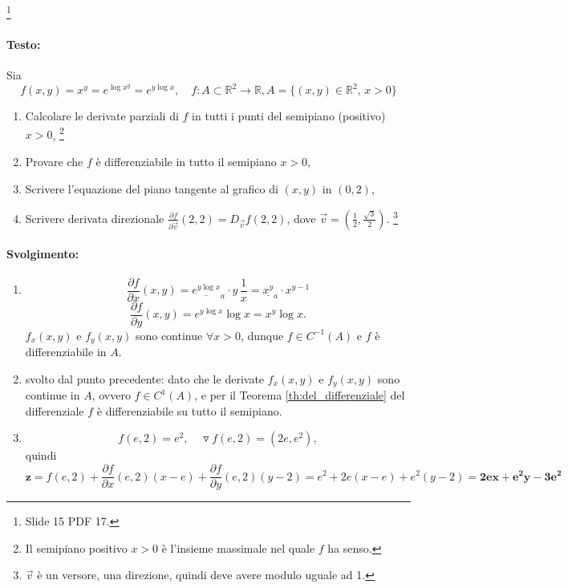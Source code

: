 \begin{example}
	\footnote{Slide 15 PDF 17.}
	\paragraph{Testo:} Sia
	\begin{equation*}
		f(x,y) = x^y = e^{\log{x^y}} = e^{y\log x},\quad f\colon A\subset\mathbb{R}^2\rightarrow\mathbb{R}, A=\{(x,y)\in\mathbb{R}^2,\, x>0\}
	\end{equation*}
	\begin{enumerate}
		\item Calcolare le derivate parziali di $f$ in tutti i punti del semipiano (positivo) $x>0$, \footnote{Il semipiano positivo $x>0$ è l'insieme massimale nel quale $f$ ha senso.}
		\item Provare che $f$ è differenziabile in tutto il semipiano $x>0$,
		\item Scrivere l'equazione del piano tangente al grafico di $(x,y)$ in $(0,2)$,
		\item Scrivere derivata direzionale $\frac{\partial f}{\partial \vec{v}}(2,2) = D_{\vec{v}} f(2,2)$, dove $\vec v = \left(\frac{1}{2}, \frac{\sqrt{3}}{2}\right)$. \footnote{$\vec v$ è un versore, una direzione, quindi deve avere modulo uguale ad 1.}
	\end{enumerate}
	\paragraph{Svolgimento:}
	\begin{enumerate}
		\item
		\begin{equation*}
			\frac{\partial f}{\partial x} (x,y) = \underline{e^{y\log x}}_{a}\cdot y\,\frac{1}{x} = \underline{x^y}_{a} \cdot x^{y-1} 
		\end{equation*}
		\begin{equation*}
			\frac{\partial f}{\partial y}(x,y) = e^{y\log x} \log x = x^y \log x.
		\end{equation*}
		$f_x(x,y)$ e $f_y(x,y)$ sono continue $\forall x>0$, dunque $f\in C^{-1}(A)$ e $f$ è differenziabile in $A$. 
		\item svolto dal punto precedente: dato che le derivate $f_x(x,y)$ e $f_y(x,y)$ sono continue in $A$, ovvero $f\in C^1(A)$, e per il Teorema \ref{th:del_differenziale} del differenziale $f$ è differenziabile su tutto il semipiano.
		\item
		\begin{equation*}
			f(e,2) = e^2,\quad \triangledown f(e,2) = (2e, e^2),
		\end{equation*}
		quindi
		\begin{equation*}
				\boldsymbol z = f(e,2) + \frac{\partial f}{\partial x} (e, 2)(x-e) + \frac{\partial f}{\partial y}(e,2)(y-2) = e^2 +2e(x-e) + e^2 (y-2) = \boldsymbol{2ex + e^2 y - 3e^2}
		\end{equation*}

\end{enumerate}
\end{example}
